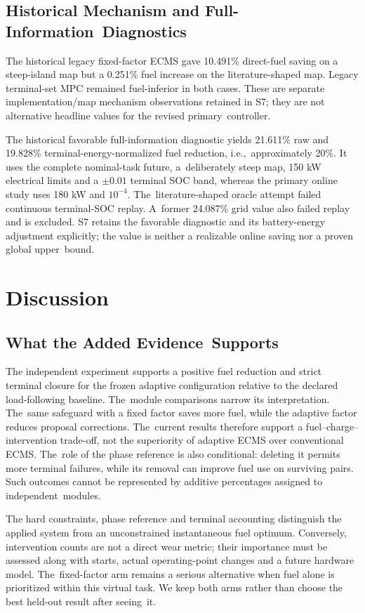 \documentclass[energies,article,submit,moreauthors]{Definitions/mdpi}
\begin{document}
\subsection{Historical Mechanism and Full-Information~Diagnostics}
The historical legacy fixed-factor ECMS gave 10.491\% direct-fuel saving on a steep-island map but a 0.251\% fuel increase on the literature-shaped map. Legacy terminal-set MPC remained fuel-inferior in both cases. These are separate implementation/map mechanism observations retained in S7; they are not alternative headline values for the revised primary~controller.

The historical favorable full-information diagnostic yields 21.611\% raw and 19.828\% terminal-energy-normalized fuel reduction, i.e.,~approximately 20\%. It uses the complete nominal-task future, a~deliberately steep map, 150 kW electrical limits and a $\pm0.01$ terminal SOC band, whereas the primary online study uses 180 kW and $10^{-4}$. The~literature-shaped oracle attempt failed continuous terminal-SOC replay. A~former 24.087\% grid value also failed replay and is excluded. S7 retains the favorable diagnostic and its battery-energy adjustment explicitly; the value is neither a realizable online saving nor a proven global upper~bound.

\section{Discussion}
\unskip
\subsection{What the Added Evidence~Supports}
The independent experiment supports a positive fuel reduction and strict terminal closure for the frozen adaptive configuration relative to the declared load-following baseline. The~module comparisons narrow its interpretation. The~same safeguard with a fixed factor saves more fuel, while the adaptive factor reduces proposal corrections. The~current results therefore support a fuel--charge--intervention trade-off, not the superiority of adaptive ECMS over conventional ECMS. The~role of the phase reference is also conditional: deleting it permits more terminal failures, while its removal can improve fuel use on surviving pairs. Such outcomes cannot be represented by additive percentages assigned to independent~modules.

The hard constraints, phase reference and terminal accounting distinguish the applied system from an unconstrained instantaneous fuel optimum. Conversely, intervention counts are not a direct wear metric; their importance must be assessed along with starts, actual operating-point changes and a future hardware model. The~fixed-factor arm remains a serious alternative when fuel alone is prioritized within this virtual task. We keep both arms rather than choose the best held-out result after seeing~it.
\end{document}
